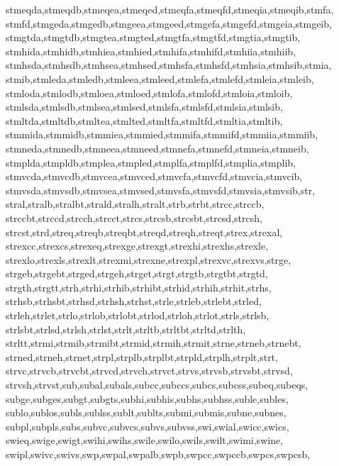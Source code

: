 {{      stmeqda,stmeqdb,stmeqea,stmeqed,stmeqfa,stmeqfd,stmeqia,stmeqib,stmfa,  %
      stmfd,stmgeda,stmgedb,stmgeea,stmgeed,stmgefa,stmgefd,stmgeia,stmgeib,  %
      stmgtda,stmgtdb,stmgtea,stmgted,stmgtfa,stmgtfd,stmgtia,stmgtib,        %
      stmhida,stmhidb,stmhiea,stmhied,stmhifa,stmhifd,stmhiia,stmhiib,        %
      stmhsda,stmhsdb,stmhsea,stmhsed,stmhsfa,stmhsfd,stmhsia,stmhsib,stmia,  %
      stmib,stmleda,stmledb,stmleea,stmleed,stmlefa,stmlefd,stmleia,stmleib,  %
      stmloda,stmlodb,stmloea,stmloed,stmlofa,stmlofd,stmloia,stmloib,        %
      stmlsda,stmlsdb,stmlsea,stmlsed,stmlsfa,stmlsfd,stmlsia,stmlsib,        %
      stmltda,stmltdb,stmltea,stmlted,stmltfa,stmltfd,stmltia,stmltib,        %
      stmmida,stmmidb,stmmiea,stmmied,stmmifa,stmmifd,stmmiia,stmmiib,        %
      stmneda,stmnedb,stmneea,stmneed,stmnefa,stmnefd,stmneia,stmneib,        %
      stmplda,stmpldb,stmplea,stmpled,stmplfa,stmplfd,stmplia,stmplib,        %
      stmvcda,stmvcdb,stmvcea,stmvced,stmvcfa,stmvcfd,stmvcia,stmvcib,        %
      stmvsda,stmvsdb,stmvsea,stmvsed,stmvsfa,stmvsfd,stmvsia,stmvsib,str,    %
      stral,stralb,stralbt,strald,stralh,stralt,strb,strbt,strcc,strccb,      %
      strccbt,strccd,strcch,strcct,strcs,strcsb,strcsbt,strcsd,strcsh,        %
      strcst,strd,streq,streqb,streqbt,streqd,streqh,streqt,strex,strexal,    %
      strexcc,strexcs,strexeq,strexge,strexgt,strexhi,strexhs,strexle,        %
      strexlo,strexls,strexlt,strexmi,strexne,strexpl,strexvc,strexvs,strge,  %
      strgeb,strgebt,strged,strgeh,strget,strgt,strgtb,strgtbt,strgtd,        %
      strgth,strgtt,strh,strhi,strhib,strhibt,strhid,strhih,strhit,strhs,     %
      strhsb,strhsbt,strhsd,strhsh,strhst,strle,strleb,strlebt,strled,        %
      strleh,strlet,strlo,strlob,strlobt,strlod,strloh,strlot,strls,strlsb,   %
      strlsbt,strlsd,strlsh,strlst,strlt,strltb,strltbt,strltd,strlth,        %
      strltt,strmi,strmib,strmibt,strmid,strmih,strmit,strne,strneb,strnebt,  %
      strned,strneh,strnet,strpl,strplb,strplbt,strpld,strplh,strplt,strt,    %
      strvc,strvcb,strvcbt,strvcd,strvch,strvct,strvs,strvsb,strvsbt,strvsd,  %
      strvsh,strvst,sub,subal,subals,subcc,subccs,subcs,subcss,subeq,subeqs,  %
      subge,subges,subgt,subgts,subhi,subhis,subhs,subhss,suble,subles,       %
      sublo,sublos,subls,sublss,sublt,sublts,submi,submis,subne,subnes,       %
      subpl,subpls,subs,subvc,subvcs,subvs,subvss,swi,swial,swicc,swics,      %
      swieq,swige,swigt,swihi,swihs,swile,swilo,swils,swilt,swimi,swine,      %
      swipl,swivc,swivs,swp,swpal,swpalb,swpb,swpcc,swpccb,swpcs,swpcsb,      %
}}
